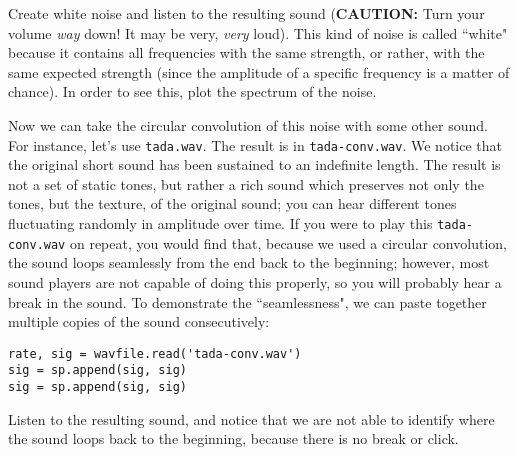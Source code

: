 \begin{problem}
Create white noise and listen to the resulting sound (\textbf{CAUTION:} Turn your volume \emph{way} down! It may be very, \emph{very} loud).
This kind of noise is called ``white" because it contains all frequencies with the same strength, or rather, with the same expected strength (since the amplitude of a specific frequency is a matter of chance).
In order to see this, plot the spectrum of the noise.
\end{problem}

Now we can take the circular convolution of this noise with some other sound.
For instance, let's use \texttt{tada.wav}.
The result is in \texttt{tada-conv.wav}.
We notice that the original short sound has been sustained to an indefinite length.
The result is not a set of static tones, but rather a rich sound which preserves not only the tones, but the texture, of the original sound; you can hear different tones fluctuating randomly in amplitude over time.
If you were to play this \texttt{tada-conv.wav} on repeat, you would find that, because we used a circular convolution, the sound loops seamlessly from the end back to the beginning; however, most sound players are not capable of doing this properly, so you will probably hear a break in the sound. To demonstrate the ``seamlessness", we can paste together multiple copies of the sound consecutively:

\begin{lstlisting}
rate, sig = wavfile.read('tada-conv.wav')
sig = sp.append(sig, sig)
sig = sp.append(sig, sig)
\end{lstlisting}

Listen to the resulting sound, and notice that we are not able to identify where the sound loops back to the beginning, because there is no break or click.



\begin{comment}
\begin{problem}
Record yourself singing a few notes (or, feel free to produce some other sound another way).
Take the circular convolution of white noise with this recording.
Now do it again using stereo white noise.
This is just like the mono white noise problem, but make the SciPy array in two dimensions.
It's no problem that your original recording will probably be mono; just make the left and right channels duplicate in the recording (but: be sure to use different left and right channels for the white noise).
Can you hear any difference between the mono and stereo versions of the result?
\end{problem}

Feel free to play around with this. The file \texttt{guitar-conv.mp3} is a collage of sounds created using this technique (mostly using guitar samples). You could probably think of other lots of other things you can do with this.
\end{comment}
